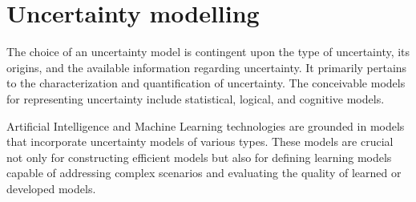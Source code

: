\documentclass[12pt, a4paper]{report}
\begin{document}
    \section{Uncertainty modelling}
    The choice of an uncertainty model is contingent upon the type of uncertainty, its origins, and the available information regarding uncertainty. 
    It primarily pertains to the characterization and quantification of uncertainty. 
    The conceivable models for representing uncertainty include statistical, logical, and cognitive models.

    Artificial Intelligence and Machine Learning technologies are grounded in models that incorporate uncertainty models of various types. 
    These models are crucial not only for constructing efficient models but also for defining learning models capable of addressing complex scenarios and evaluating the quality of learned or developed models.
\end{document}
